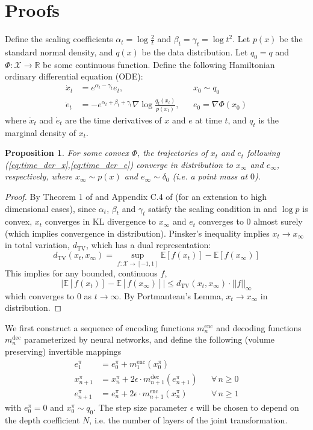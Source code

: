 \documentclass{article}
\def\gX{{\mathcal{X}}}
\newcommand{\E}{\mathbb{E}}
\newcommand{\R}{\mathbb{R}}
\newcommand{\e}{\epsilon}
\newtheorem{proposition}{Proposition}
\begin{document}
\newpage
\section{Proofs}
\label{app:proofs}

Define the scaling coefficients $\alpha_t = \log \frac{2}{t}$ and $\beta_t = \gamma_t = \log t^2$.
Let $p(x)$ be the standard normal density, and $q(x)$ be the data distribution.
Let $q_0=q$ and $\Phi:\gX\rightarrow\R$ be some continuous function. 
Define the following Hamiltonian ordinary differential equation (ODE):
\begin{align}
\dot{x}_t &= e^{\alpha_t-\gamma_t}e_t, && x_0\sim q_0 \label{eq:time_der_x}\\
\dot{e}_t &= -e^{\alpha_t+\beta_t+\gamma_t}\nabla\log \frac{q_t(x_t)}{p(x_t)}, &&e_0=\nabla\Phi(x_0) \label{eq:time_der_e}
\end{align}
where $\dot{x}_t$ and $\dot{e}_t$ are the time derivatives of $x$ and $e$ at time $t$, and $q_t$ is the marginal density of $x_t$. 

\begin{proposition}
For some convex $\Phi$, the trajectories of $x_t$ and $e_t$ following (\ref{eq:time_der_x},\ref{eq:time_der_e}) converge in distribution to $x_\infty$ and $e_\infty$, respectively, where $x_\infty\sim p(x)$ and $e_\infty\sim\delta_0$ (i.e. a point mass at $0$).
\label{prop:hode}
\end{proposition}
\begin{proof}
By Theorem 1 of \citet{taghvaei19a} and Appendix C.4 of \citet{wang2019accelerated} (for an extension to high dimensional cases), 
since $\alpha_t$, $\beta_t$ and $\gamma_t$ satisfy the scaling condition in \citet{taghvaei19a} and $\log p$ is convex,
$x_t$ converges in KL divergence to $x_\infty$ and $e_t$ converges to $0$ almost surely (which implies convergence in distribution). 
Pinsker's inequality implies $x_t\rightarrow x_\infty$ in total variation, $d_\mathrm{TV}$, which has a dual representation:
$$d_\mathrm{TV}(x_t,x_\infty)=\sup_{f:\gX\rightarrow[-1,1]} \E[f(x_t)] - \E[f(x_\infty)]$$
This implies for any bounded, continuous $f$,
$$|\E[f(x_t)] - \E[f(x_\infty)]| \leq d_\mathrm{TV}(x_t,x_\infty)\cdot ||f||_\infty$$
which converges to $0$ as $t\rightarrow\infty$. 
By Portmanteau's Lemma, $x_t\rightarrow x_\infty$ in distribution.
\end{proof}

We first construct a sequence of encoding functions $m^{\text{enc}}_{n}$ and decoding functions $m^{\text{dec}}_{n}$ parameterized by neural networks, and define the following (volume preserving) invertible mappings
\begin{align*}
e^\pi_{1} &= e^\pi_0 + m^{\text{enc}}_{1}(x^\pi_0)\\
x^\pi_{n+1} &= x^\pi_{n} + 2\e \cdot m^{\text{dec}}_{{n+1}}(e^\pi_{n+1})  && \forall\,n\geq0\\
e^\pi_{n+1} &= e^\pi_n + 2\e \cdot m^{\text{enc}}_{{n+1}}(x^\pi_n) && \forall\,n\geq1
\end{align*}
with $e^\pi_0=0$ and $x^\pi_0 \sim q_0$. 
The step size parameter $\e$ will be chosen to depend on the depth coefficient $N$, i.e. the number of layers of the joint transformation. 
\end{document}
